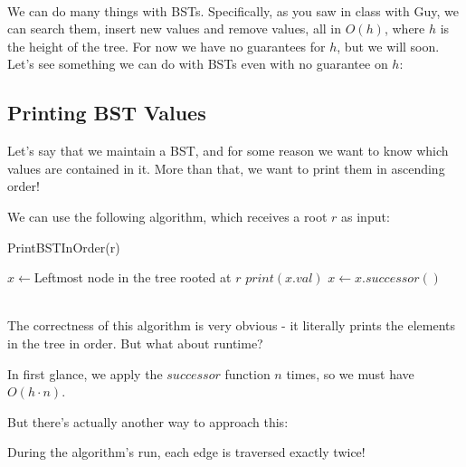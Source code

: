 \documentclass[12pt]{article}
\begin{document}
\\

We can do many things with BSTs. Specifically, as you saw in class with Guy, we can search them, insert new values and remove values, all in $O(h)$, where $h$ is the height of the tree. For now we have no guarantees for $h$, but we will soon. Let's see something we can do with BSTs even with no guarantee on $h$:

\subsection{Printing BST Values}
Let's say that we maintain a BST, and for some reason we want to know which values are contained in it. More than that, we want to print them in ascending order! 

We can use the following algorithm, which receives a root $r$ as input:

\begin{algorithm}
\caption{PrintBSTInOrder(r)}
\begin{algorithmic}[1]
\State $x\leftarrow$Leftmost node in the tree rooted at $r$
\State $print(x.val)$
\State $x\leftarrow x.successor()$
\EndWhile
\end{algorithmic}
\end{algorithm} 
 \\

The correctness of this algorithm is very obvious - it literally prints the elements in the tree in order. But what about runtime?

In first glance, we apply the $successor$ function $n$ times, so we must have $O(h\cdot n)$. 

But there's actually another way to approach this:

\begin{claim}
During the algorithm's run, each edge is traversed exactly twice!
\end{claim}
\end{document}
